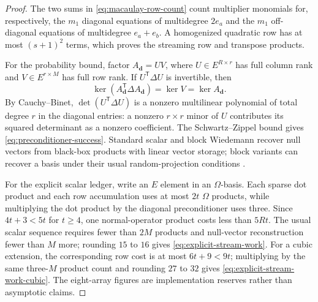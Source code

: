 \documentclass[11pt]{article}
\newcommand{\transpose}{\mathsf T}
\begin{document}
\begin{proof}
The two sums in \eqref{eq:macaulay-row-count} count multiplier monomials for,
respectively, the $m_1$ diagonal equations of multidegree $2e_a$ and the
$m_1$ off-diagonal equations of multidegree $e_a+e_b$.  A homogenized
quadratic row has at most $(s+1)^2$ terms, which proves the streaming row and
transpose products.

For the probability bound, factor $A_{\mathbf d}=UV$, where
$U\in E^{R\times r}$ has full column rank and
$V\in E^{r\times M}$ has full row rank.  If $U^{\transpose}\Delta U$ is
invertible, then
\[
 \ker(A_{\mathbf d}^{\transpose}\Delta A_{\mathbf d})
 =\ker V=\ker A_{\mathbf d}.
\]
By Cauchy--Binet,
$\det(U^{\transpose}\Delta U)$ is a nonzero multilinear polynomial of total
degree $r$ in the diagonal entries: a nonzero $r\times r$ minor of $U$
contributes its squared determinant as a nonzero coefficient.  The
Schwartz--Zippel bound gives \eqref{eq:preconditioner-success}.  Standard
scalar and block Wiedemann recover null vectors from black-box products with
linear vector storage; block variants can recover a basis under their usual
random-projection conditions
\cite{Coppersmith1994BlockWiedemann,ChengEtAl2012XL,JouxPierrot2015NearlySparse}.

For the explicit scalar ledger, write an $E$ element in an $\Omega$-basis.
Each sparse dot product and each row accumulation uses at most $2t$
$\Omega$ products, while multiplying the dot product by the diagonal
preconditioner uses three.  Since $4t+3<5t$ for $t\ge4$, one normal-operator
product costs less than $5Rt$.  The usual scalar sequence requires fewer than
$2M$ products and null-vector reconstruction fewer than $M$ more; rounding
$15$ to $16$ gives \eqref{eq:explicit-stream-work}.  For a cubic extension,
the corresponding row cost is at most $6t+9<9t$; multiplying by the same
three-$M$ product count and rounding $27$ to $32$ gives
\eqref{eq:explicit-stream-work-cubic}.  The eight-array figures are
implementation reserves rather than asymptotic claims.
\end{proof}
\end{document}
